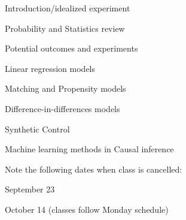 \documentclass[11 pt]{article}
\begin{document}
\begin{outline}
\item Introduction/idealized experiment


\item Probability and Statistics review

%
\item Potential outcomes and experiments


\item Linear regression models 

\item Matching and Propensity models

\item Difference-in-differences models

\item Synthetic Control

\item Machine learning methods in Causal inference

\end{outline}

Note the following dates when class is cancelled:
\begin{blist}
\item September 23
\item October 14 (classes follow Monday schedule)
\end{blist}
\end{document}
